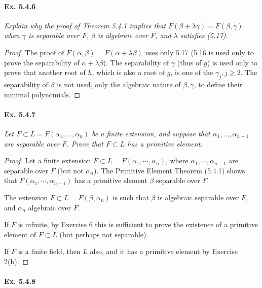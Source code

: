 \documentclass[11pt,a4paper]{article}
\begin{document}
\paragraph{Ex. 5.4.6}

{\it Explain why the proof of Theorem 5.4.1 implies that $F(\beta + \lambda \gamma) = F(\beta, \gamma)$ when $\gamma$ is separable over $F$, $\beta$ is algebraic over $F$, and $\lambda$ satisfies (5.17).
}

\begin{proof}
The proof of $F(\alpha,\beta) = F(\alpha+\lambda \beta)$ uses only 5.17 (5.16 is used only to prove the separability of $\alpha+\lambda \beta$).
The separability of $\gamma$ (thus of $g$) is used only to prove that another root of $h$, which is also a root of $g$, is one of the $\gamma_j, j\geq 2$.
The separability of $\beta$ is not used, only the algebraic nature of $\beta,\gamma$, to define their minimal polynomials.
\end{proof}

\paragraph{Ex. 5.4.7}

{\it Let $F \subset L = F(\alpha_1,\ldots,\alpha_n)$ be a finite extension, and suppose that $\alpha_1,\ldots,\alpha_{n-1}$ are separable over $F$. Prove that $F \subset L$ has a primitive element.
}

\begin{proof}
Let a finite extension $F\subset L = F(\alpha_1,\cdots,\alpha_n)$, where $\alpha_1,\cdots,\alpha_{n-1}$ are separable over $F$ (but not $\alpha_n$). The Primitive Element Theorem (5.4.1) shows that $F(\alpha_1,\cdots,\alpha_{n-1})$ has a primitive element $\beta$ separable over $F$.

The extension $F\subset L=F(\beta,\alpha_n)$ is such that $\beta$ is algebraic separable over $F$, and $\alpha_n$ algebraic over $F$. 

If $F$ is infinite, by Exercise 6 this is sufficient to prove the existence of a primitive element of $F \subset L$ (but perhaps not separable).

If $F$ is a finite field, then  $L$ also, and it has a primitive element by Exercise 2(b).
\end{proof}

\paragraph{Ex. 5.4.8}
\end{document}
